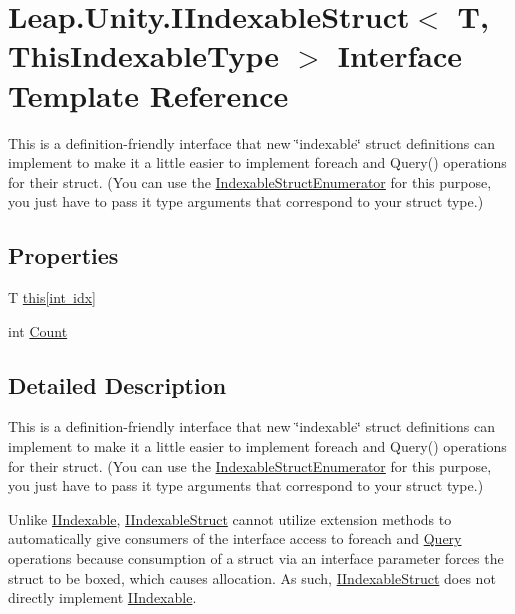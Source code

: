 \hypertarget{interface_leap_1_1_unity_1_1_i_indexable_struct}{}\section{Leap.\+Unity.\+I\+Indexable\+Struct$<$ T, This\+Indexable\+Type $>$ Interface Template Reference}
\label{interface_leap_1_1_unity_1_1_i_indexable_struct}


This is a definition-\/friendly interface that new \char`\"{}indexable\char`\"{} struct definitions can implement to make it a little easier to implement foreach and Query() operations for their struct. (You can use the \mbox{\hyperlink{struct_leap_1_1_unity_1_1_indexable_struct_enumerator}{Indexable\+Struct\+Enumerator}} for this purpose, you just have to pass it type arguments that correspond to your struct type.)  


\subsection*{Properties}
\begin{DoxyCompactItemize}
\item 
T \mbox{\hyperlink{interface_leap_1_1_unity_1_1_i_indexable_struct_ad7283ee0dd67d3a6c03fd76050ec220b}{this\mbox{[}int idx\mbox{]}}}
\item 
int \mbox{\hyperlink{interface_leap_1_1_unity_1_1_i_indexable_struct_ad6584007443da506772ba213121443d5}{Count}}
\end{DoxyCompactItemize}


\subsection{Detailed Description}
This is a definition-\/friendly interface that new \char`\"{}indexable\char`\"{} struct definitions can implement to make it a little easier to implement foreach and Query() operations for their struct. (You can use the \mbox{\hyperlink{struct_leap_1_1_unity_1_1_indexable_struct_enumerator}{Indexable\+Struct\+Enumerator}} for this purpose, you just have to pass it type arguments that correspond to your struct type.) 

Unlike \mbox{\hyperlink{interface_leap_1_1_unity_1_1_i_indexable}{I\+Indexable}}, \mbox{\hyperlink{interface_leap_1_1_unity_1_1_i_indexable_struct}{I\+Indexable\+Struct}} cannot utilize extension methods to automatically give consumers of the interface access to foreach and \mbox{\hyperlink{namespace_leap_1_1_unity_1_1_query}{Query}} operations because consumption of a struct via an interface parameter forces the struct to be boxed, which causes allocation. As such, \mbox{\hyperlink{interface_leap_1_1_unity_1_1_i_indexable_struct}{I\+Indexable\+Struct}} does not directly implement \mbox{\hyperlink{interface_leap_1_1_unity_1_1_i_indexable}{I\+Indexable}}.

